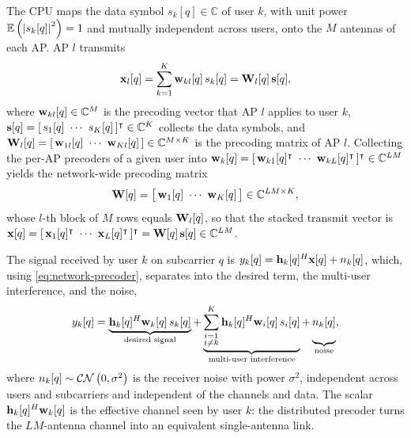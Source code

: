 The CPU maps the data symbol $s_{k}[q]\in\mathbb{C}$ of user $k$, with unit
power $\mathbb{E}\left(\left\lvert s_{k}[q]\right\rvert^2\right)=1$ and mutually independent across users, onto the
$M$ antennas of each AP. AP $l$ transmits
\begin{equation}
\label{eq:ap-transmit}
\boldsymbol{\mathrm{x}}_{l}[q] = \sum_{k=1}^{K} \boldsymbol{\mathrm{w}}_{kl}[q]\, s_{k}[q]
= \boldsymbol{\mathrm{W}}_{l}[q]\,\boldsymbol{\mathrm{s}}[q],
\end{equation}
where $\boldsymbol{\mathrm{w}}_{kl}[q]\in\mathbb{C}^{M}$ is the precoding vector that AP $l$ applies to
user $k$, $\vect{s}[q]=[\,s_{1}[q]\ \cdots\ s_{K}[q]\,]^{\intercal}\inC{K}$
collects the data symbols, and
$\mat{W}_{l}[q]=[\,\vect{w}_{1l}[q]\ \cdots\ \vect{w}_{Kl}[q]\,]\inC{M\times K}$
is the precoding matrix of AP $l$. Collecting the per-AP precoders of a given
user into
$\vect{w}_{k}[q]=[\,\vect{w}_{k1}[q]^{\intercal}\ \cdots\ \vect{w}_{kL}[q]^{\intercal}\,]^{\intercal}\inC{LM}$
yields the network-wide precoding matrix
\begin{equation}
\label{eq:network-precoder}
\boldsymbol{\mathrm{W}}[q] = \big[\,\boldsymbol{\mathrm{w}}_{1}[q]\ \cdots\ \boldsymbol{\mathrm{w}}_{K}[q]\,\big]
\in\mathbb{C}^{LM\times K},
\end{equation}
whose $l$-th block of $M$ rows equals $\boldsymbol{\mathrm{W}}_{l}[q]$, so that the stacked
transmit vector is
$\vect{x}[q]=[\,\vect{x}_{1}[q]^{\intercal}\ \cdots\ \vect{x}_{L}[q]^{\intercal}\,]^{\intercal}=\mat{W}[q]\,\vect{s}[q]\inC{LM}$.

The signal received by user $k$ on subcarrier $q$ is
$y_{k}[q]=\boldsymbol{\mathrm{h}}_{k}[q]^{H}\boldsymbol{\mathrm{x}}[q]+n_{k}[q]$, which, using
\eqref{eq:network-precoder}, separates into the desired term, the multi-user
interference, and the noise,
\begin{equation}
\label{eq:downlink-received}
y_{k}[q] =
\underbrace{\vect{h}_{k}[q]^{H}\vect{w}_{k}[q]\, s_{k}[q]}_{\text{desired signal}}
+ \underbrace{\sum_{\substack{i=1 \\ i\neq k}}^{K}
\vect{h}_{k}[q]^{H}\vect{w}_{i}[q]\, s_{i}[q]}_{\text{multi-user interference}}
+ \underbrace{\vphantom{\sum_{i=1}^{K}} n_{k}[q]}_{\text{noise}},
\end{equation}
where $n_{k}[q]\sim\mathcal{C}\mathcal{N}\left(0,\sigma^{2}\right)$ is the receiver noise with power
$\sigma^{2}$, independent across users and subcarriers and independent of the
channels and data. The scalar $\boldsymbol{\mathrm{h}}_{k}[q]^{H}\boldsymbol{\mathrm{w}}_{k}[q]$ is the
effective channel seen by user $k$: the distributed precoder turns the
$LM$-antenna channel into an equivalent single-antenna link.

